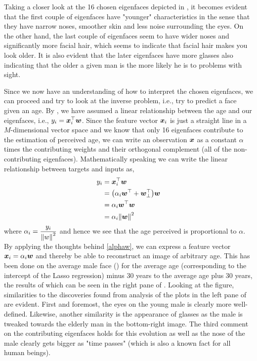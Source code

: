 Taking a closer look at the 16 chosen eigenfaces depicted in , it becomes evident that the first couple of eigenfaces have "younger" characteristics in the sense that they have narrow noses, smoother skin and less noise surrounding the eyes. On the other hand, the last couple of eigenfaces seem to have wider noses and significantly more facial hair, which seems to indicate that facial hair makes you look older. It is also evident that the later eigenfaces have more glasses also indicating that the older a given man is the more likely he is to problems with sight.

Since we now have an understanding of how to interpret the chosen eigenfaces, we can proceed and try to look at the inverse problem, i.e., try to predict a face given an age. By , we have assumed a linear relationship between the age and our eigenfaces, i.e., $y_i = \bm{x}_i^{\top} \bm{w}$. Since the feature vector $\bm{x}_i$ is just a straight line in a $M$-dimensional vector space and we know that only 16 eigenfaces contribute to the estimation of perceived age, we can write an observation $\bm{x}$ as a constant $\alpha$ times the contributing weights and their orthogonal complement (all of the non-contributing eigenfaces). Mathematically speaking we can write the linear relationship between targets and inputs as,
\begin{equation}\label{eq:alphaw}
    \begin{split}
        y_i &=\bm{x}_i^{\top} \bm{w} \\
            &=\qty(\alpha_i \bm{w}^{\top} + \bm{w}_{\perp}^{\top} )\bm{w} \\
            &= \alpha_i \bm{w}^{\top} \bm{w} \\
            &= \alpha_i \norm{\bm{w}}^2
    \end{split}
\end{equation}
where $\alpha_i= \dfrac{y_i}{\norm{w}^2}$ and hence we see that the age perceived is proportional to $\alpha$. By applying the thoughts behind \eqref{alphaw}, we can express a feature vector $\bm{x}_i= \alpha_i \bm{w}$ and thereby be able to reconstruct an image of arbitrary age. This has been done on the average male face () for the average age (corresponding to the intercept of the Lasso regression) minus 30 years to the average age plus 30 years, the results of which can be seen in the right pane of . Looking at the figure, similarities to the discoveries found from analysis of the plots in the left pane of  are evident. First and foremost, the eyes on the young male is clearly more well-defined. Likewise, another similarity is the appearance of glasses as the male is tweaked towards the elderly man in the bottom-right image. The third comment on the contributing eigenfaces holds for this evolution as well as the nose of the male clearly gets bigger as "time passes" (which is also a known fact for all human beings).

